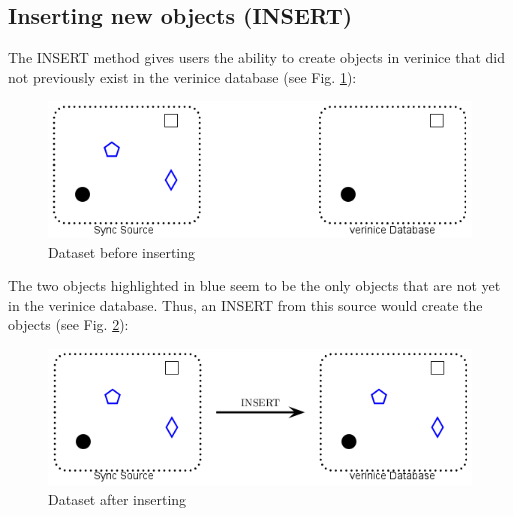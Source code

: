 \documentclass[a4paper,10pt]{book}
\begin{document}
\subsection{Inserting new objects (INSERT)}
The INSERT method gives users the ability to create objects in verinice that did not previously exist in the verinice database (see Fig. \ref{Dataset before inserting}):
\newline
\begin{figure}[htb!]
  \centering
  \includegraphics[scale=.5]{Screenshot/SyncAPI_pre_INSERT-en.png}
  \caption{\label{Dataset before inserting} Dataset before inserting}
\end{figure}
\newline
The two objects highlighted in blue seem to be the only objects that are not yet in the verinice database.
Thus, an \textsc{INSERT} from this source would create the objects (see Fig. \ref{Dataset after inserting}):
\newline
\begin{figure}[htb!]
  \centering
  \includegraphics[scale=.7]{Screenshot/SyncAPI_post_INSERT-en.png}
  \caption{\label{Dataset after inserting} Dataset after inserting}
\end{figure}
\newline
\end{document}
